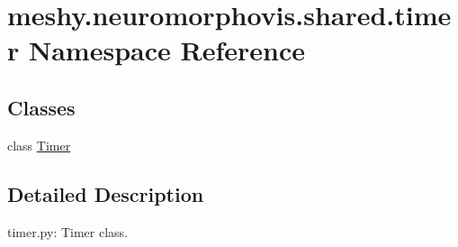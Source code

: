 \hypertarget{namespacemeshy_1_1neuromorphovis_1_1shared_1_1timer}{}\section{meshy.\+neuromorphovis.\+shared.\+timer Namespace Reference}
\label{namespacemeshy_1_1neuromorphovis_1_1shared_1_1timer}
\subsection*{Classes}
\begin{DoxyCompactItemize}
\item 
class \hyperlink{classmeshy_1_1neuromorphovis_1_1shared_1_1timer_1_1Timer}{Timer}
\end{DoxyCompactItemize}


\subsection{Detailed Description}
\begin{DoxyVerb}timer.py:
    Timer class.
\end{DoxyVerb}
 